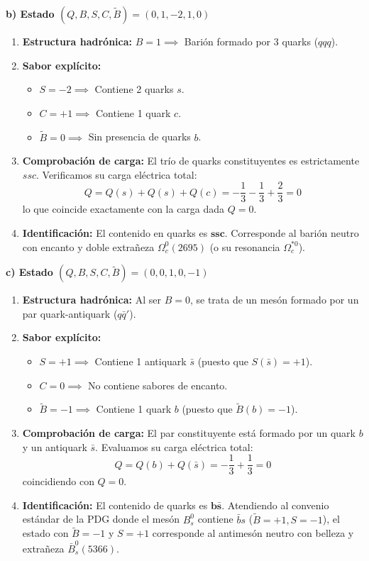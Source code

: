\begin{problema}
\textbf{b) Estado $(Q, B, S, C, \tilde{B}) = (0, 1, -2, 1, 0)$}
\begin{enumerate}[label=\arabic*.]
    \item \textbf{Estructura hadrónica:} $B = 1 \implies$ Barión formado por 3 quarks ($qqq$).
    \item \textbf{Sabor explícito:}
    \begin{itemize}
        \item $S = -2 \implies$ Contiene 2 quarks $s$.
        \item $C = +1 \implies$ Contiene 1 quark $c$.
        \item $\tilde{B} = 0 \implies$ Sin presencia de quarks $b$.
    \end{itemize}
    \item \textbf{Comprobación de carga:} El trío de quarks constituyentes es estrictamente $ssc$. Verificamos su carga eléctrica total:
    \begin{equation*}
        Q = Q(s) + Q(s) + Q(c) = -\frac{1}{3} - \frac{1}{3} + \frac{2}{3} = 0
    \end{equation*}
    lo que coincide exactamente con la carga dada $Q = 0$.
    \item \textbf{Identificación:} El contenido en quarks es $\mathbf{ssc}$. Corresponde al barión neutro con encanto y doble extrañeza \textbf{$\Omega_c^0(2695)$} (o su resonancia $\Omega_c^{*0}$).
\end{enumerate}

\textbf{c) Estado $(Q, B, S, C, \tilde{B}) = (0, 0, 1, 0, -1)$}
\begin{enumerate}[label=\arabic*.]
    \item \textbf{Estructura hadrónica:} Al ser $B = 0$, se trata de un mesón formado por un par quark-antiquark ($q\bar{q}'$).
    \item \textbf{Sabor explícito:}
    \begin{itemize}
        \item $S = +1 \implies$ Contiene 1 antiquark $\bar{s}$ (puesto que $S(\bar{s}) = +1$).
        \item $C = 0 \implies$ No contiene sabores de encanto.
        \item $\tilde{B} = -1 \implies$ Contiene 1 quark $b$ (puesto que $\tilde{B}(b) = -1$).
    \end{itemize}
    \item \textbf{Comprobación de carga:} El par constituyente está formado por un quark $b$ y un antiquark $\bar{s}$. Evaluamos su carga eléctrica total:
    \begin{equation*}
        Q = Q(b) + Q(\bar{s}) = -\frac{1}{3} + \frac{1}{3} = 0
    \end{equation*}
    coincidiendo con $Q = 0$.
    \item \textbf{Identificación:} El contenido de quarks es $\mathbf{b\bar{s}}$. Atendiendo al convenio estándar de la PDG donde el mesón $B_s^0$ contiene $\bar{b}s$ ($\tilde{B}=+1, S=-1$), el estado con $\tilde{B}=-1$ y $S=+1$ corresponde al antimesón neutro con belleza y extrañeza \textbf{$\bar{B}_s^0(5366)$}.
\end{enumerate}


\end{problema}
